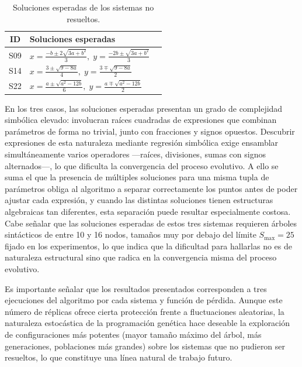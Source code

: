 \documentclass{article} \usepackage[utf8]{inputenc} \usepackage[spanish]{babel} \usepackage{amsmath, amssymb, amsthm} \usepackage{bm} \usepackage{float} \usepackage{longtable} \usepackage[hidelinks]{hyperref} \spanishdecimal{.}
\begin{document}
\begin{table}[H] \centering \caption{Soluciones esperadas de los sistemas no resueltos.} \label{tab:sistemas_fallidos} \renewcommand{\arraystretch}{1.4} \begin{tabular}{cll} \hline
ID & Soluciones esperadas \\
\hline S09 & $x = \frac{-b \pm 2\sqrt{3a+b^{2}}}{3},\; y = \frac{-2b \pm \sqrt{3a+b^{2}}}{3}$ \\[6pt] S14 & $x = \frac{3 \pm \sqrt{9-8a}}{4},\; y = \frac{3 \mp \sqrt{9-8a}}{2}$ \\[6pt] S22 & $x = \frac{a \pm \sqrt{a^{2}-12b}}{6},\;
          y = \frac{a \mp \sqrt{a^{2}-12b}}{2}$ \\
\hline \end{tabular} \end{table}

En los tres casos, las soluciones esperadas presentan un grado de complejidad simbólica elevado: involucran raíces cuadradas de expresiones que combinan parámetros de forma no trivial, junto con fracciones y signos opuestos. Descubrir expresiones de esta naturaleza mediante regresión simbólica exige ensamblar simultáneamente varios operadores —raíces, divisiones, sumas con signos alternados—, lo que dificulta la convergencia del proceso evolutivo. A ello se suma el que la presencia de múltiples soluciones para una misma tupla de parámetros obliga al algoritmo a separar correctamente los puntos antes de poder ajustar cada expresión, y cuando las distintas soluciones tienen estructuras algebraicas tan diferentes, esta separación puede resultar especialmente costosa. Cabe señalar que las soluciones esperadas de estos tres sistemas requieren árboles sintácticos de entre 10 y 16 nodos, tamaños muy por debajo del límite $S_{\max} = 25$ fijado en los experimentos, lo que indica que la dificultad para hallarlas no es de naturaleza estructural sino que radica en la convergencia misma del proceso evolutivo.

Es importante señalar que los resultados presentados corresponden a tres ejecuciones del algoritmo por cada sistema y función de pérdida. Aunque este número de réplicas ofrece cierta protección frente a fluctuaciones aleatorias, la naturaleza estocástica de la programación genética hace deseable la exploración de configuraciones más potentes (mayor tamaño máximo del árbol, más generaciones, poblaciones más grandes) sobre los sistemas que no pudieron ser resueltos, lo que constituye una línea natural de trabajo futuro.
\end{document}
